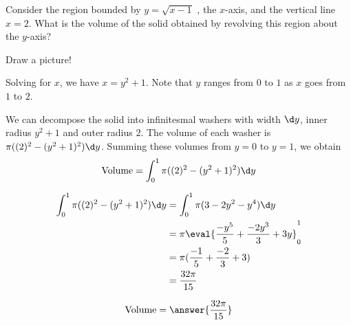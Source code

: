 \documentclass[handout]{ximera}
\begin{document}
\begin{exercise}
Consider the region bounded by $y =\sqrt{x-1}$ , the $x$-axis, and the
vertical line $x=2$.  What is the volume of the solid obtained by
revolving this region about the $y$-axis?
\begin{hint}
  Draw a picture!
\end{hint}

\begin{hint}
  Solving for $x$, we have $x = y^2+1$.  Note that $y$ ranges from $0$ to $1$ as $x$ goes from $1$ to $2$.
\end{hint}

\begin{hint}
  We can decompose the solid into infinitesmal washers with width
  $\d y$, inner radius $y^2+1$ and outer radius $2$.  The volume of each
  washer is $\pi((2)^2 - (y^2+1)^2)\d y$.  Summing these volumes from
  $y=0$ to $y=1$, we obtain
  \[
  \textrm{Volume} = \int_0^1 \pi((2)^2 - (y^2+1)^2)\d y
  \]
\end{hint}

\begin{hint}
  \begin{align*}
    \int_0^1\pi((2)^2 - (y^2+1)^2)\d y &=  \int_0^1 \pi(3-2y^2-y^4)\d y\\
    &= \pi \eval{\frac{-y^5}{5}+\frac{-2y^3}{3}+3y}_0^1\\
    &=\pi(\frac{-1}{5}+\frac{-2}{3}+3)\\
    &=\frac{32\pi}{15}
  \end{align*}
\end{hint}

\begin{prompt}
  \[
  \textrm{Volume} = \answer{\frac{32\pi}{15}}
  \]
\end{prompt}
\end{exercise}
\end{document}
